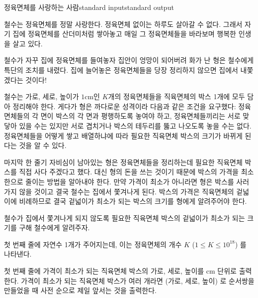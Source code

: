 \begin{problem}{정육면체를 사랑하는 사람}{standard input}{standard output}

철수는 정육면체를 정말 사랑한다. 정육면체 없이는 하루도 살아갈 수 없다.
그래서 자기 집에 정육면체를 산더미처럼 쌓아놓고 매일 그 정육면체들을 바라보며 행복한 인생을 살고 있다.

철수가 자꾸 집에 정육면체를 들여놓자 집안이 엉망이 되어버려 화가 난 형은 철수에게 특단의 조치를 내렸다.
집에 늘어놓은 정육면체들을 당장 정리하지 않으면 집에서 내쫓겠다는 것이다!

철수는 가로, 세로, 높이가 $1$cm인 $K$개의 정육면체들을 직육면체의 박스 1개에 모두 담아 정리해야 한다.
게다가 형은 까다로운 성격이라 다음과 같은 조건을 요구했다: 
정육면체들의 각 면이 박스의 각 면과 평행하도록 놓여야 하고, 
정육면체들끼리는 서로 맞닿아 있을 수는 있지만 서로 겹치거나 박스의 테두리를 뚫고 나오도록 놓을 수는 없다.
정육면체들을 어떻게 쌓고 배열하냐에 따라 필요한 직육면체 박스의 크기가 바뀌게 된다는 것을 알 수 있다.

마지막 한 줄기 자비심이 남아있는 형은 정육면체들을 정리하는데 필요한 직육면체 박스를 직접 사다 주겠다고 했다.
대신 형의 돈을 쓰는 것이기 때문에 박스의 가격을 최소한으로 줄이는 방법을 알아내야 한다.
만약 가격이 최소가 아니라면 형은 박스를 사러 가지 않을 것이고 결국 철수는 집에서 쫓겨나게 된다.
박스의 가격은 직육면체의 겉넓이에 비례하므로 결국 겉넓이가 최소가 되는 박스의 크기를 형에게 알려주어야 한다.

철수가 집에서 쫓겨나게 되지 않도록 필요한 직육면체 박스의 겉넓이가 최소가 되는 크기를 구해 철수에게 알려주자.

\InputFile
첫 번째 줄에 자연수 1개가 주어지는데, 이는 정육면체의 개수 $K$ ($1 \le K \le 10^{18}$) 를 나타낸다.

\OutputFile
첫 번째 줄에 가격이 최소가 되는 직육면체 박스의 가로, 세로, 높이를 cm 단위로 출력한다.
가격이 최소가 되는 직육면체 박스가 여러 개라면 (가로, 세로, 높이) 로 순서쌍을 만들었을 때
사전 순으로 제일 앞서는 것을 출력한다.

\Example

\begin{example}
%
%
\end{example}

\end{problem}
